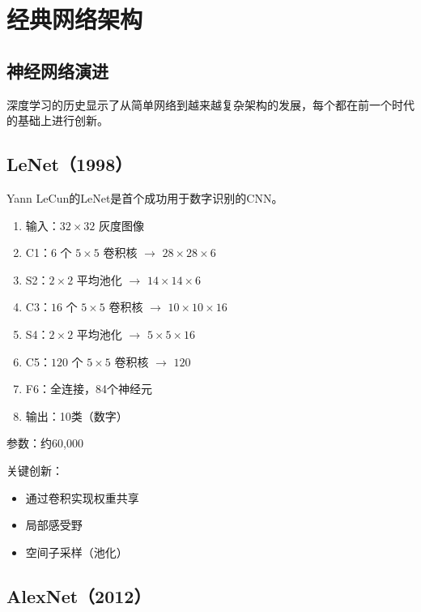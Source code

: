 %

\clearpage
\cleardoublepage

\chapter{经典网络架构}

\section{神经网络演进}

深度学习的历史显示了从简单网络到越来越复杂架构的发展，每个都在前一个时代的基础上进行创新。

\section{LeNet（1998）}

Yann LeCun的LeNet是首个成功用于数字识别的CNN。

\begin{architecture}[LeNet-5架构]
\begin{enumerate}
    \item 输入：$32\times32$ 灰度图像
    \item C1：$6$ 个 $5\times5$ 卷积核 $\rightarrow$ $28\times28\times6$
    \item S2：$2\times2$ 平均池化 $\rightarrow$ $14\times14\times6$
    \item C3：$16$ 个 $5\times5$ 卷积核 $\rightarrow$ $10\times10\times16$
    \item S4：$2\times2$ 平均池化 $\rightarrow$ $5\times5\times16$
    \item C5：$120$ 个 $5\times5$ 卷积核 $\rightarrow$ $120$
    \item F6：全连接，84个神经元
    \item 输出：10类（数字）
\end{enumerate}
\end{architecture}

参数：约60,000

关键创新：
\begin{itemize}
    \item 通过卷积实现权重共享
    \item 局部感受野
    \item 空间子采样（池化）
\end{itemize}

\section{AlexNet（2012）}

